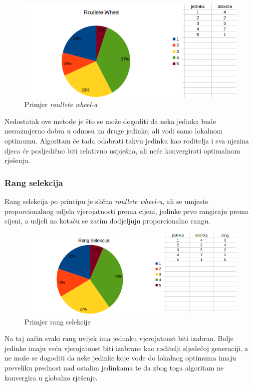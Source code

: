 \documentclass[times, utf8, zavrsni]{fer}
\begin{document}
\begin{figure}[htb]
\centering
\includegraphics[width=14cm]{images/roullete_wheel_selection.png}
\caption{Primjer \textit{roullete wheel-a}}
\label{fig:roullete wheel}
\end{figure}

Nedostatak ove metode je što se može dogoditi da neka jedinka bude nesrazmjerno dobra u odnosu na druge jedinke, ali vodi samo lokalnom optimumu. Algoritam će tada odabrati takvu jedinku kao roditelja i sva njezina djeca će posljedično biti relativno uspješna, ali neće konvergirati optimalnom rješenju.

\subsubsection{Rang selekcija}
Rang selekcija po principu je slična \textit{roullete wheel-u}, ali se umjesto proporcionalnog udjela vjerojatnosti prema cijeni, jedinke prvo rangiraju prema cijeni, a udjeli na kotaču se zatim dodjeljuju proporcionalno rangu.

\begin{figure}[htb]
\centering
\includegraphics[width=14cm]{images/rang_selekcija.png}
\caption{Primjer rang selekcije}
\label{fig:rang selekcija}
\end{figure}

Na taj način svaki rang uvijek ima jednaku vjerojatnost biti izabran. Bolje jedinke imaju veću vjerojatnost biti izabrane kao roditelji sljedećoj generaciji, a ne može se dogoditi da neke jedinke koje vode do lokalnog optimuma imaju preveliku prednost nad ostalim jedinkama te da zbog toga algoritam ne konvergira u globalno rješenje.
\end{document}
